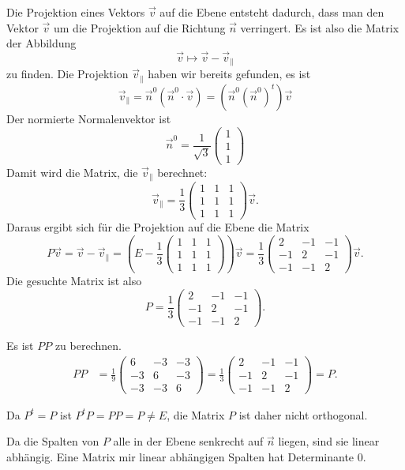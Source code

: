 \begin{loesung}
\begin{teilaufgaben}
\item
Die Projektion eines Vektors $\vec v$ auf die Ebene entsteht dadurch, dass man
den Vektor $\vec v$ um die Projektion auf die Richtung $\vec n$ verringert.
Es ist also die Matrix der Abbildung
\[
\vec v\mapsto \vec v - \vec v_{\|}
\]
zu finden.
Die Projektion $\vec v_{\|}$ haben wir bereits gefunden, es ist
\[
\vec v_{\|}
=
\vec n^0
(\vec n^0\cdot \vec v)
=
(\vec n^0(\vec n^0)^t)\vec v
\]
Der normierte Normalenvektor ist
\[
\vec n^0 =\frac1{\sqrt{3}}\begin{pmatrix}1\\1\\1\end{pmatrix}
\]
Damit wird die Matrix, die $\vec v_{\|}$ berechnet:
\[
\vec v_{\|}
=
\frac13\begin{pmatrix}
1&1&1\\
1&1&1\\
1&1&1
\end{pmatrix}
\vec v.
\]
Daraus ergibt sich für die Projektion auf die Ebene die Matrix
\[
P\vec v
=
\vec v-\vec v_{\|}
=
\left(E-
\frac13\begin{pmatrix}
1&1&1\\
1&1&1\\
1&1&1
\end{pmatrix}\right)
\vec v
=
\frac13
\begin{pmatrix}
 2&-1&-1\\
-1& 2&-1\\
-1&-1& 2
\end{pmatrix}
\vec v.
\]
Die gesuchte Matrix ist also
\[
P=
\frac13
\begin{pmatrix}
 2&-1&-1\\
-1& 2&-1\\
-1&-1& 2
\end{pmatrix}.
\]
\item
Es ist $PP$ zu berechnen.
\begin{align*}
PP
&=
\frac19
\begin{pmatrix}
 6&-3&-3\\
-3& 6&-3\\
-3&-3& 6
\end{pmatrix}
=
\frac13
\begin{pmatrix}
 2&-1&-1\\
-1& 2&-1\\
-1&-1& 2
\end{pmatrix}
=P.
\end{align*}
\item
Da $P^t=P$ ist $P^tP=PP=P\ne E$, die Matrix $P$ ist daher nicht
orthogonal.
\item
Da die Spalten von $P$ alle in der Ebene senkrecht auf $\vec n$ liegen,
sind sie linear abhängig. 
Eine Matrix mir linear abhängigen Spalten hat Determinante $0$.
\end{teilaufgaben}
\end{loesung}

